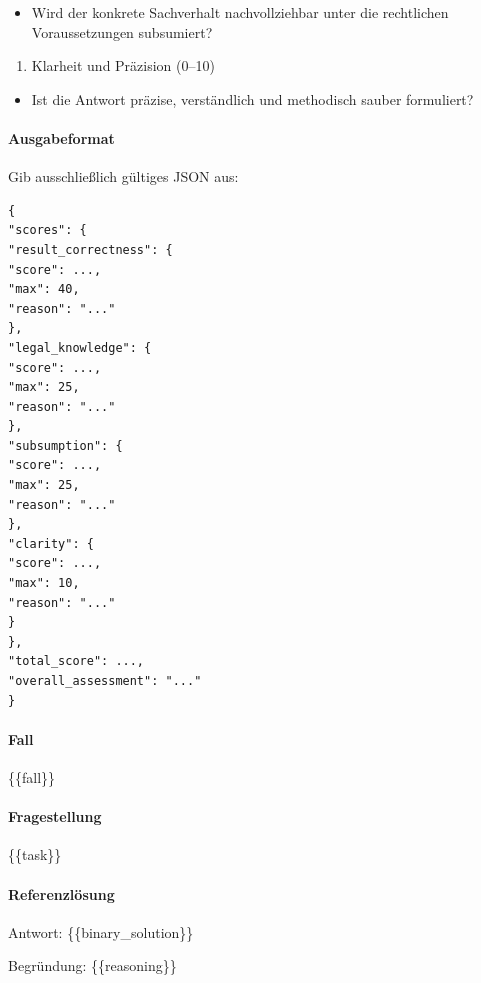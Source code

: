 \documentclass[11pt]{article}
\providecommand{\tightlist}{%
  \setlength{\itemsep}{0pt}\setlength{\parskip}{0pt}}
\begin{document}
\begin{itemize}
\tightlist
\item
  Wird der konkrete Sachverhalt nachvollziehbar unter die rechtlichen
  Voraussetzungen subsumiert?
\end{itemize}

\begin{enumerate}
\def\labelenumi{\arabic{enumi}.}
\tightlist
\item
  Klarheit und Präzision (0--10)
\end{enumerate}

\begin{itemize}
\tightlist
\item
  Ist die Antwort präzise, verständlich und methodisch sauber
  formuliert?
\end{itemize}

\paragraph{Ausgabeformat}\label{ausgabeformat-2}

Gib ausschließlich gültiges JSON aus:

\begin{verbatim}
{
"scores": {
"result_correctness": {
"score": ...,
"max": 40,
"reason": "..."
},
"legal_knowledge": {
"score": ...,
"max": 25,
"reason": "..."
},
"subsumption": {
"score": ...,
"max": 25,
"reason": "..."
},
"clarity": {
"score": ...,
"max": 10,
"reason": "..."
}
},
"total_score": ...,
"overall_assessment": "..."
}
\end{verbatim}

\paragraph{Fall}\label{fall-1}

\{\{fall\}\}

\paragraph{Fragestellung}\label{fragestellung-1}

\{\{task\}\}

\paragraph{Referenzlösung}\label{referenzluxf6sung}

Antwort: \{\{binary\_solution\}\}

Begründung: \{\{reasoning\}\}
\end{document}
